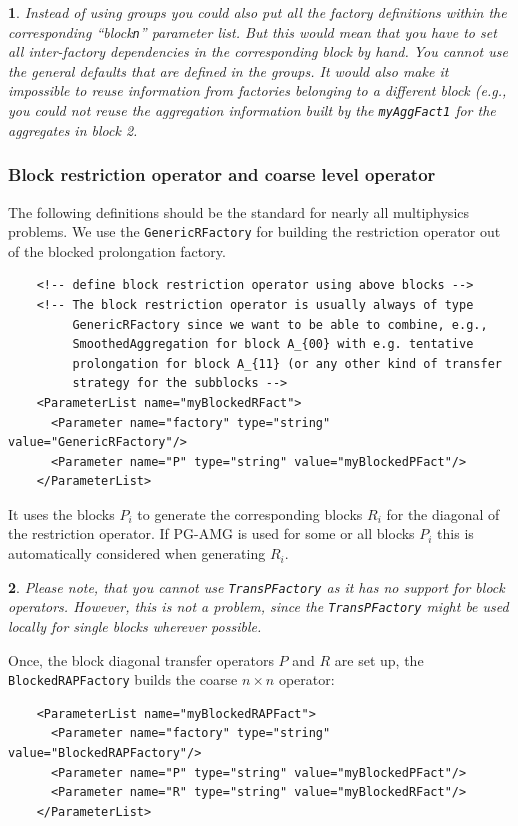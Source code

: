 \documentclass[10pt,fleqn]{book}
\newtheorem*{mycomment}{\ding{42}}
\begin{document}
\begin{mycomment}
Instead of using groups you could also put all the factory definitions within the corresponding ``block\texttt{n}'' parameter list. But this would mean that you have to set all inter-factory dependencies in the corresponding block by hand. You cannot use the general defaults that are defined in the groups. It would also make it impossible to reuse information from factories belonging to a different block (e.g., you could not reuse the aggregation information built by the \texttt{myAggFact1} for the aggregates in block 2.
\end{mycomment}

\subsubsection{Block restriction operator and coarse level operator}

The following definitions should be the standard for nearly all multiphysics problems. We use the \texttt{GenericRFactory} for building the restriction operator out of the blocked prolongation factory.

\begin{lstlisting}
    <!-- define block restriction operator using above blocks -->
    <!-- The block restriction operator is usually always of type
         GenericRFactory since we want to be able to combine, e.g.,
         SmoothedAggregation for block A_{00} with e.g. tentative
         prolongation for block A_{11} (or any other kind of transfer
         strategy for the subblocks -->
    <ParameterList name="myBlockedRFact">
      <Parameter name="factory" type="string" value="GenericRFactory"/>
      <Parameter name="P" type="string" value="myBlockedPFact"/>
    </ParameterList>
\end{lstlisting}

It uses the blocks $P_i$ to generate the corresponding blocks $R_i$ for the diagonal of the restriction operator. If PG-AMG is used for some or all blocks $P_i$ this is automatically considered when generating $R_i$.

\begin{mycomment}
Please note, that you cannot use \texttt{TransPFactory} as it has no support for block operators. However, this is not a problem, since the \texttt{TransPFactory} might be used locally for single blocks wherever possible.
\end{mycomment}

Once, the block diagonal transfer operators $P$ and $R$ are set up, the \texttt{BlockedRAPFactory} builds the coarse $n\times n$ operator:
\begin{lstlisting}
    <ParameterList name="myBlockedRAPFact">
      <Parameter name="factory" type="string" value="BlockedRAPFactory"/>
      <Parameter name="P" type="string" value="myBlockedPFact"/>
      <Parameter name="R" type="string" value="myBlockedRFact"/>
    </ParameterList>
\end{lstlisting}
\end{document}
